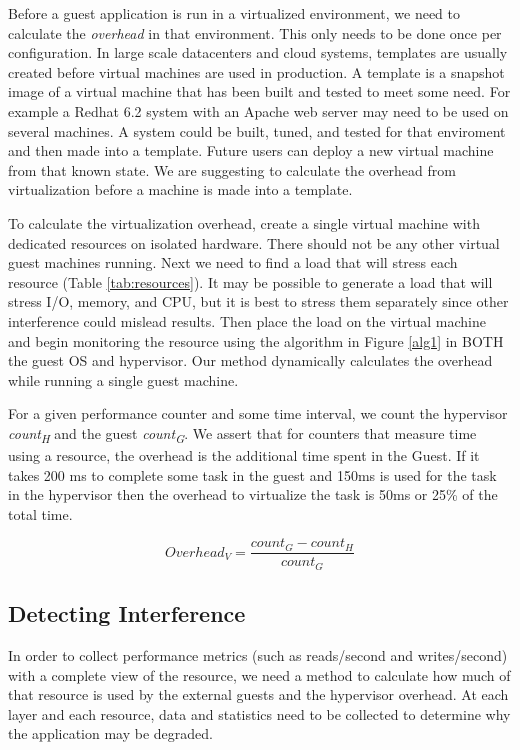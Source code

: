 \indent Before a guest application is run in a virtualized environment, we need to calculate the \emph{overhead} in that environment.  This only needs to be done once per configuration.  In large scale datacenters and cloud systems, templates are usually created before virtual machines are used in production.  A template is a snapshot image of a virtual machine that has been built and tested to meet some need.  For example a Redhat 6.2 system with an Apache web server may need to be used on several machines.  A system could be built, tuned, and tested for that enviroment and then made into a template.  Future users can deploy a new virtual machine from that known state.  We are suggesting to calculate the overhead from virtualization before a machine is made into a template.  

\indent To calculate the virtualization overhead, create a single virtual machine with dedicated resources on isolated hardware.  
There should not be any other virtual guest machines running.  Next we need to find a load that will stress each resource (Table \ref{tab:resources}).  
It may be possible to generate a load that will stress I/O, memory, and CPU, but it is best to stress them separately since other interference could mislead results.  
Then place the load on the virtual machine and begin monitoring the resource using the algorithm in Figure \ref{alg1} in BOTH the guest OS and hypervisor. 
Our method dynamically calculates the overhead while running a single guest machine.

\indent For a given performance counter and some time interval, we count the hypervisor \emph{count\textsubscript{H}} and the guest \emph{count\textsubscript{G}}.  
We assert that for counters that measure time using a resource, the overhead is the additional time spent in the Guest.  
If it takes 200 ms to complete some task in the guest and 150ms is used for the task in the hypervisor then the overhead to virtualize the task is 50ms or 25\% of the total time.

\begin{equation}
  Overhead_V = \frac{count_G - count_H}{count_G} 
\end{equation}

\subsection{Detecting Interference}
In order to collect performance metrics (such as reads/second and writes/second) with a complete view of the resource, we need a method to calculate how much of that resource is used by the external guests and the hypervisor overhead.  
At each layer and each resource, data and statistics need to be collected to determine why the application may be degraded.

